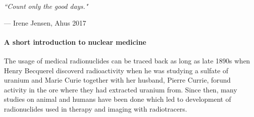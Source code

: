 \documentclass[twoside,english]{uiofysmaster/uiofysmaster}
\begin{document}
\epigraph{\itshape ``Count only the good days."}{--- \textup{ Irene Jensen}, Ahus 2017}
 









\paragraph{A short introduction to nuclear medicine} \mbox{}

\noindent
The usage of medical radionuclides can be traced back as long as late 1890s when Henry Becquerel discoverd radioactivity when he was studying a sulfate of uranium and Marie Curie together with her husband, Pierre Currie, forund activity in the ore where they had extracted uranium from. Since then, many studies on animal and humans have been done which led to development of radionuclides used in therapy and imaging with radiotracers.
\end{document}

